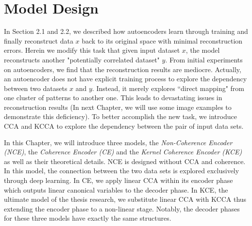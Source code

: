\documentclass[12pt]{report} %
\begin{document}
\chapter{Model Design}
In Section 2.1 and 2.2, we described how autoencoders learn through training and finally reconstruct data $x$ back to its original space with minimal reconstruction errors. Herein we modify this task that given input dataset $x$, the model reconstructs another "potentially correlated dataset" $y$. From initial experiments on autoencoders, we find that the reconstruction results are mediocre. Actually, an autoencoder does not have explicit training process to explore the dependency between two datasets $x$ and $y$. Instead, it merely explores ``direct mapping" from one cluster of patterns to another one. This leads to devastating issues in reconstruction results (In next Chapter, we will use some image examples to demonstrate this deficiency). To better accomplish the new task, we introduce CCA and KCCA to explore the dependency between the pair of input data sets. 

In this Chapter, we will introduce three models, the \textit{Non-Coherence Encoder (NCE)}, the \textit{Coherence Encoder (CE)} and the \textit{Kernel Coherence Encoder (KCE)} as well as their theoretical details. NCE is designed without CCA and coherence. In this model, the connection between the two data sets is explored exclusively through deep learning. In CE, we apply linear CCA within its encoder phase which outputs linear canonical variables to the decoder phase. In KCE, the ultimate model of the thesis research, we substitute linear CCA with KCCA thus extending the encoder phase to a non-linear stage. Notably, the decoder phases for these three models have exactly the same structures. 
\end{document}
